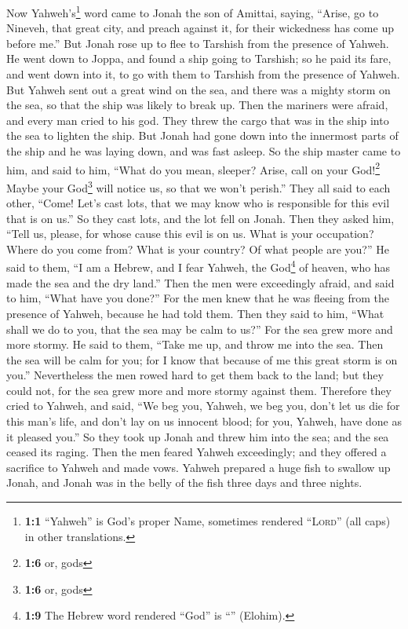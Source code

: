 \begin{paracol}{2}
\begin{otherlanguage}{english}
 Now Yahweh's\footnote{\textbf{1:1} ``Yahweh'' is God's
  proper Name, sometimes rendered ``\textsc{Lord}'' (all caps) in other
  translations.} word came to Jonah the son of Amittai, saying,
 ``Arise, go to Nineveh, that great city, and preach
against it, for their wickedness has come up before me.'' 
But Jonah rose up to flee to Tarshish from the presence of Yahweh. He
went down to Joppa, and found a ship going to Tarshish; so he paid its
fare, and went down into it, to go with them to Tarshish from the
presence of Yahweh.  But Yahweh sent out a great wind on
the sea, and there was a mighty storm on the sea, so that the ship was
likely to break up.  Then the mariners were afraid, and
every man cried to his god. They threw the cargo that was in the ship
into the sea to lighten the ship. But Jonah had gone down into the
innermost parts of the ship and he was laying down, and was fast asleep.
 So the ship master came to him, and said to him, ``What
do you mean, sleeper? Arise, call on your God!\footnote{\textbf{1:6} or,
  gods} Maybe your God\footnote{\textbf{1:6} or, gods} will notice us,
so that we won't perish.''  They all said to each other,
``Come! Let's cast lots, that we may know who is responsible for this
evil that is on us.'' So they cast lots, and the lot fell on Jonah.
 Then they asked him, ``Tell us, please, for whose cause
this evil is on us. What is your occupation? Where do you come from?
What is your country? Of what people are you?''  He said
to them, ``I am a Hebrew, and I fear Yahweh, the God\footnote{\textbf{1:9}
  The Hebrew word rendered ``God'' is ``'' (Elohim).} of
heaven, who has made the sea and the dry land.''  Then
the men were exceedingly afraid, and said to him, ``What have you
done?'' For the men knew that he was fleeing from the presence of
Yahweh, because he had told them.  Then they said to him,
``What shall we do to you, that the sea may be calm to us?'' For the sea
grew more and more stormy.  He said to them, ``Take me
up, and throw me into the sea. Then the sea will be calm for you; for I
know that because of me this great storm is on you.'' 
Nevertheless the men rowed hard to get them back to the land; but they
could not, for the sea grew more and more stormy against them.
 Therefore they cried to Yahweh, and said, ``We beg you,
Yahweh, we beg you, don't let us die for this man's life, and don't lay
on us innocent blood; for you, Yahweh, have done as it pleased you.''
 So they took up Jonah and threw him into the sea; and
the sea ceased its raging.  Then the men feared Yahweh
exceedingly; and they offered a sacrifice to Yahweh and made vows.
 Yahweh prepared a huge fish to swallow up Jonah, and
Jonah was in the belly of the fish three days and three nights.


\end{otherlanguage}
\end{paracol}

